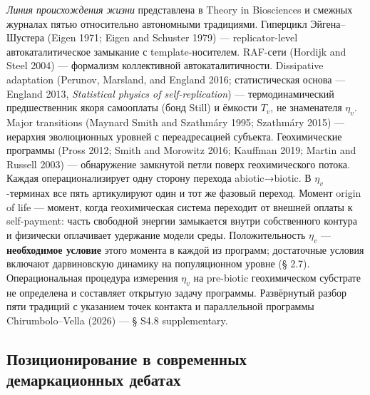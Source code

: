 \documentclass[pdflatex,sn-mathphys-ay]{sn-jnl}
\begin{document}
\emph{Линия происхождения жизни} представлена в Theory in Biosciences и смежных журналах пятью относительно автономными традициями. Гиперцикл Эйгена--Шустера (Eigen 1971; Eigen and Schuster 1979) --- replicator-level автокаталитическое замыкание с template-носителем. RAF-сети (Hordijk and Steel 2004) --- формализм коллективной автокаталитичности. Dissipative adaptation (Perunov, Marsland, and England 2016; статистическая основа --- England 2013, \emph{Statistical physics of self-replication}) --- термодинамический предшественник якоря самооплаты (бонд Still) и ёмкости \(T_v\), не знаменателя \(\eta_v\). Major transitions (Maynard Smith and Szathmáry 1995; Szathmáry 2015) --- иерархия эволюционных уровней с переадресацией субъекта. Геохимические программы (Pross 2012; Smith and Morowitz 2016; Kauffman 2019; Martin and Russell 2003) --- обнаружение замкнутой петли поверх геохимического потока. Каждая операционализирует одну сторону перехода abiotic→biotic. В \(\eta_v\)-терминах все пять артикулируют один и тот же фазовый переход. Момент origin of life --- момент, когда геохимическая система переходит от внешней оплаты к self-payment: часть свободной энергии замыкается внутри собственного контура и физически оплачивает удержание модели среды. Положительность \(\eta_v\) --- \textbf{необходимое условие} этого момента в каждой из программ; достаточные условия включают дарвиновскую динамику на популяционном уровне (§ 2.7). Операциональная процедура измерения \(\eta_v\) на pre-biotic геохимическом субстрате не определена и составляет открытую задачу программы. Развёрнутый разбор пяти традиций с указанием точек контакта и параллельной программы Chirumbolo--Vella (2026) --- § S4.8 supplementary.

\subsection{Позиционирование в современных демаркационных дебатах}\label{ux43fux43eux437ux438ux446ux438ux43eux43dux438ux440ux43eux432ux430ux43dux438ux435-ux432-ux441ux43eux432ux440ux435ux43cux435ux43dux43dux44bux445-ux434ux435ux43cux430ux440ux43aux430ux446ux438ux43eux43dux43dux44bux445-ux434ux435ux431ux430ux442ux430ux445}
\end{document}
